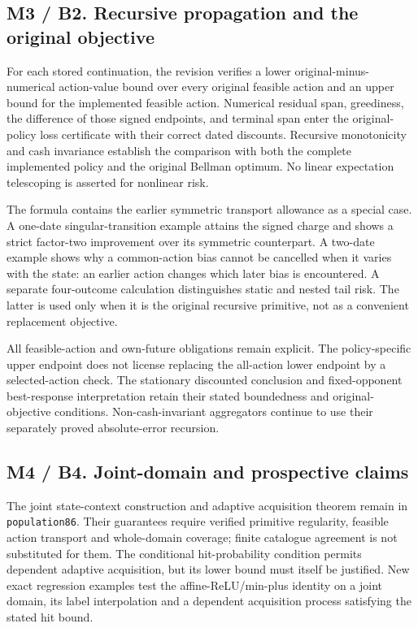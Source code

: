\hypertarget{m3-b2.-recursive-propagation-and-the-original-objective}{%
\subsection{M3 / B2. Recursive propagation and the original
objective}\label{m3-b2.-recursive-propagation-and-the-original-objective}}

For each stored continuation, the revision verifies a lower
original-minus-numerical action-value bound over every original feasible
action and an upper bound for the implemented feasible action. Numerical
residual span, greediness, the difference of those signed endpoints, and
terminal span enter the original-policy loss certificate with their
correct dated discounts. Recursive monotonicity and cash invariance
establish the comparison with both the complete implemented policy and
the original Bellman optimum. No linear expectation telescoping is
asserted for nonlinear risk.

The formula contains the earlier symmetric transport allowance as a
special case. A one-date singular-transition example attains the signed
charge and shows a strict factor-two improvement over its symmetric
counterpart. A two-date example shows why a common-action bias cannot be
cancelled when it varies with the state: an earlier action changes which
later bias is encountered. A separate four-outcome calculation
distinguishes static and nested tail risk. The latter is used only when
it is the original recursive primitive, not as a convenient replacement
objective.

All feasible-action and own-future obligations remain explicit. The
policy-specific upper endpoint does not license replacing the all-action
lower endpoint by a selected-action check. The stationary discounted
conclusion and fixed-opponent best-response interpretation retain their
stated boundedness and original-objective conditions. Non-cash-invariant
aggregators continue to use their separately proved absolute-error
recursion.

\hypertarget{m4-b4.-joint-domain-and-prospective-claims}{%
\subsection{M4 / B4. Joint-domain and prospective
claims}\label{m4-b4.-joint-domain-and-prospective-claims}}

The joint state-context construction and adaptive acquisition theorem
remain in \texttt{population86}. Their guarantees require verified
primitive regularity, feasible action transport and whole-domain
coverage; finite catalogue agreement is not substituted for them. The
conditional hit-probability condition permits dependent adaptive
acquisition, but its lower bound must itself be justified. New exact
regression examples test the affine-ReLU/min-plus identity on a joint
domain, its label interpolation and a dependent acquisition process
satisfying the stated hit bound.

